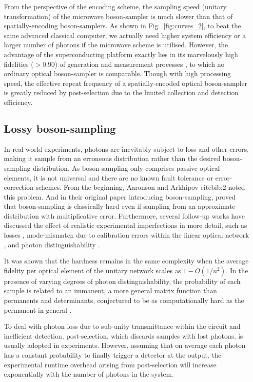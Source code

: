 \documentclass[aps,rmp,twocolumn,amsmath,amssymb,nofootinbib,superscriptaddress]{revtex4}
\newcommand{\comment}[1]{{\color{blue}{#1}}}
\begin{document}
From the perspective of the encoding scheme, the sampling speed (unitary transformation) of the microwave boson-sampler is much slower than that of spatially-encoding boson-samplers. As shown in Fig.~\ref{fig:curves_2}, to beat the same advanced classical computer, we actually need higher system efficiency or a larger number of photons if the microwave scheme is utilised. However, the advantage of the superconducting platform exactly lies in its marvelously high fidelities ($>0.90$) of generation and measurement processes \cite{bib:21}, to which no ordinary optical boson-sampler is comparable. Though with high processing speed, the effective repeat frequency of a spatially-encoded optical boson-sampler is greatly reduced by post-selection due to the limited collection and detection efficiency. \comment{This doesn't make sense to me - explain it better}

\subsection{Lossy boson-sampling}

In real-world experiments, photons are inevitably subject to loss and other errors, making it sample from an erroneous distribution rather than the desired boson-sampling distribution. As boson-sampling only comprises passive optical elements, it is not universal and there are no known fault tolerance or error-correction schemes. From the beginning, Aaronson and Arkhipov 
cite{bib:2} noted this problem. And in their original paper introducing boson-sampling, proved that boson-sampling is classically hard even if sampling from an approximate distribution with multiplicative error. Furthermore, several follow-up works have discussed the effect of realistic experimental imperfections in more detail, such as losses \cite{bib:22}, mode-mismatch due to calibration errors within the linear optical network \cite{bib:23, bib:24}, and photon distinguishability \cite{bib:25, bib:26, bib:27, bib:28, bib:29, bib:30}.

It was shown that the hardness remains in the same complexity when the average fidelity per optical element of the unitary network scales as \mbox{$1-O(1/n^2)$}. In the presence of varying degrees of photon distinguishability, the probability of each sample is related to an immanent, a more general matrix function than permanents and determinants, conjectured to be as computationally hard as the permanent in general \cite{bib:31, bib:32}.

To deal with photon loss due to sub-unity transmittance within the circuit and inefficient detection, post-selection, which discards samples with lost photons, is usually adopted in experiments. However, assuming that on average each photon has a constant probability to finally trigger a detector at the output, the experimental runtime overhead arising from post-selection will increase exponentially with the number of photons in the system.
\end{document}

